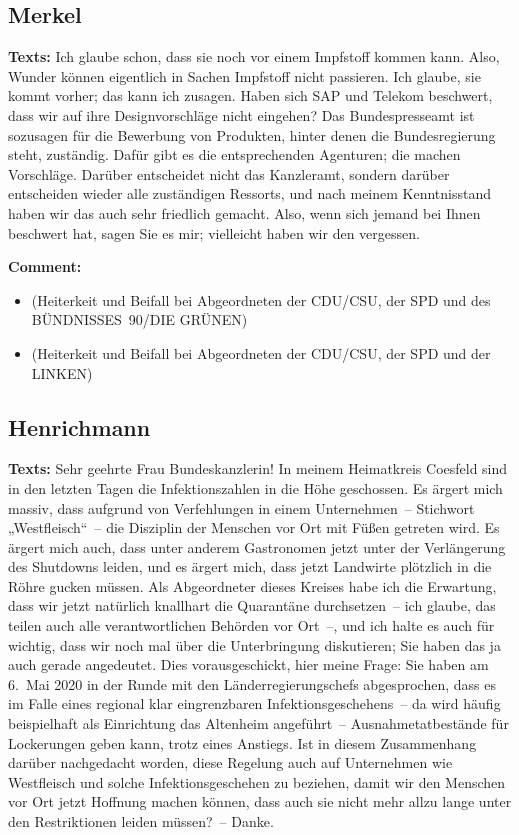 \documentclass{article}
\begin{document}
\subsection{Merkel}
\noindent\textbf{Texts:} Ich glaube schon, dass sie noch vor einem Impfstoff kommen kann. Also, Wunder können eigentlich in Sachen Impfstoff nicht passieren. Ich glaube, sie kommt vorher; das kann ich zusagen. Haben sich SAP und Telekom beschwert, dass wir auf ihre Designvorschläge nicht eingehen?  Das Bundespresseamt ist sozusagen für die Bewerbung von Produkten, hinter denen die Bundesregierung steht, zuständig. Dafür gibt es die entsprechenden Agenturen; die machen Vorschläge. Darüber entscheidet nicht das Kanzleramt, sondern darüber entscheiden wieder alle zuständigen Ressorts, und nach meinem Kenntnisstand haben wir das auch sehr friedlich gemacht. Also, wenn sich jemand bei Ihnen beschwert hat, sagen Sie es mir; vielleicht haben wir den vergessen. 

\noindent\textbf{Comment:}
\begin{itemize}
    \setlength\itemsep{-3pt}
    \item (Heiterkeit und Beifall bei Abgeordneten der CDU/CSU, der SPD und des BÜNDNISSES 90/DIE GRÜNEN)
    \setlength\itemsep{-3pt}
    \item (Heiterkeit und Beifall bei Abgeordneten der CDU/CSU, der SPD und der LINKEN)
\end{itemize}
\subsection{Henrichmann}
\noindent\textbf{Texts:} Sehr geehrte Frau Bundeskanzlerin! In meinem Heimatkreis Coesfeld sind in den letzten Tagen die Infektionszahlen in die Höhe geschossen. Es ärgert mich massiv, dass aufgrund von Verfehlungen in einem Unternehmen – Stichwort „Westfleisch“ – die Disziplin der Menschen vor Ort mit Füßen getreten wird. Es ärgert mich auch, dass unter anderem Gastronomen jetzt unter der Verlängerung des Shutdowns leiden, und es ärgert mich, dass jetzt Landwirte plötzlich in die Röhre gucken müssen.  Als Abgeordneter dieses Kreises habe ich die Erwartung, dass wir jetzt natürlich knallhart die Quarantäne durchsetzen – ich glaube, das teilen auch alle verantwortlichen Behörden vor Ort –, und ich halte es auch für wichtig, dass wir noch mal über die Unterbringung diskutieren; Sie haben das ja auch gerade angedeutet. Dies vorausgeschickt, hier meine Frage: Sie haben am 6. Mai 2020 in der Runde mit den Länderregierungschefs abgesprochen, dass es im Falle eines regional klar eingrenzbaren Infektionsgeschehens – da wird häufig beispielhaft als Einrichtung das Altenheim angeführt – Ausnahmetatbestände für Lockerungen geben kann, trotz eines Anstiegs. Ist in diesem Zusammenhang darüber nachgedacht worden, diese Regelung auch auf Unternehmen wie Westfleisch und solche Infektionsgeschehen zu beziehen, damit wir den Menschen vor Ort jetzt Hoffnung machen können, dass auch sie nicht mehr allzu lange unter den Restriktionen leiden müssen? – Danke.
\end{document}
